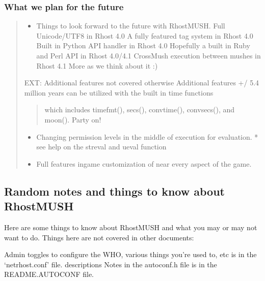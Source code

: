 \documentclass[letterpaper,10pt,english]{sphinxmanual}
\begin{document}
\subsubsection{What we plan for the future}
\label{\detokenize{features:what-we-plan-for-the-future}}\begin{quote}
\begin{itemize}
\item {} 
\sphinxAtStartPar
Things to look forward to the future with RhostMUSH.
\sphinxhyphen{} Full Unicode/UTF8 in Rhost 4.0
\sphinxhyphen{} A fully featured tag system in Rhost 4.0
\sphinxhyphen{} Built in Python API handler in Rhost 4.0
\sphinxhyphen{} Hopefully a built in Ruby and Perl API in Rhost 4.0/4.1
\sphinxhyphen{} Cross\sphinxhyphen{}Mush execution between mushes in Rhost 4.1
\sphinxhyphen{} More as we think about it :)

\end{itemize}

\sphinxAtStartPar
EXT: Additional features not covered otherwise
Additional features
\sphinxhyphen{} +/\sphinxhyphen{} 5.4 million years can be utilized with the built in time functions
\begin{quote}

\sphinxAtStartPar
which includes timefmt(), secs(), convtime(), convsecs(), and moon().  Party on!
\end{quote}
\begin{itemize}
\item {} 
\sphinxAtStartPar
Changing permission levels in the middle of execution for evaluation.
* see help on the streval and ueval function

\item {} 
\sphinxAtStartPar
Full features in\sphinxhyphen{}game customization of near every aspect of the game.

\end{itemize}
\end{quote}


\subsection{Random notes and things to know about RhostMUSH}
\label{\detokenize{features:random-notes-and-things-to-know-about-rhostmush}}
\sphinxAtStartPar
Here are some things to know about RhostMUSH and what you may or may not
want to do.  Things here are not covered in other documents:

\sphinxAtStartPar
Admin toggles to configure the WHO, various things you’re used to, etc is in the
‘netrhost.conf’ file.  descriptions Notes in the autoconf.h file is in the
README.AUTOCONF file.
\end{document}
